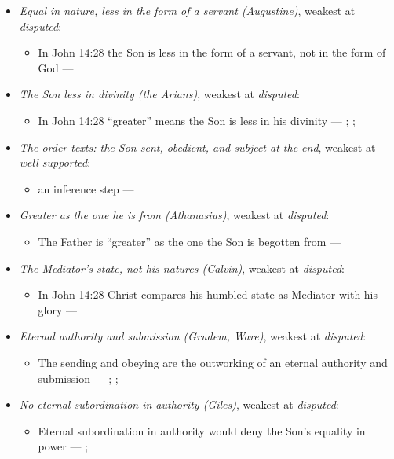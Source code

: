 \documentclass[11pt,paper=\testimonypaper,DIV=13,parskip=false]{scrartcl}
\begin{document}
\begin{itemize}
\item \emph{Equal in nature, less in the form of a servant (Augustine)}, weakest at \emph{disputed}:
\begin{itemize}
\item In John 14:28 the Son is less in the form of a servant, not in the form of God --- \cite[On the Trinity I.7.14]{schaff-nicene-post-nicene-fathers-1-3-1887}
\end{itemize}
\item \emph{The Son less in divinity (the Arians)}, weakest at \emph{disputed}:
\begin{itemize}
\item In John 14:28 “greater” means the Son is less in his divinity --- \cite[De Synodis 28]{schaff-nicene-post-nicene-fathers-2-4-1892}; \cite[On the Trinity I.7.14]{schaff-nicene-post-nicene-fathers-1-3-1887}; \cite[102]{calvin-commentary-john-2-1847}
\end{itemize}
\item \emph{The order texts: the Son sent, obedient, and subject at the end}, weakest at \emph{well supported}:
\begin{itemize}
\item an inference step --- \cite[3, The Triune God]{kibbey-living-systematic-theology-2026}
\end{itemize}
\item \emph{Greater as the one he is from (Athanasius)}, weakest at \emph{disputed}:
\begin{itemize}
\item The Father is “greater” as the one the Son is begotten from --- \cite[Against the Arians I.13.58]{schaff-nicene-post-nicene-fathers-2-4-1892}
\end{itemize}
\item \emph{The Mediator’s state, not his natures (Calvin)}, weakest at \emph{disputed}:
\begin{itemize}
\item In John 14:28 Christ compares his humbled state as Mediator with his glory --- \cite[102--103]{calvin-commentary-john-2-1847}
\end{itemize}
\item \emph{Eternal authority and submission (Grudem, Ware)}, weakest at \emph{disputed}:
\begin{itemize}
\item The sending and obeying are the outworking of an eternal authority and submission --- \cite[40]{grudem-doctrinal-deviations-2015}; \cite{grudem-ets-trinity-2016}; \cite{ware-father-son-holy-spirit-2005}
\end{itemize}
\item \emph{No eternal subordination in authority (Giles)}, weakest at \emph{disputed}:
\begin{itemize}
\item Eternal subordination in authority would deny the Son’s equality in power --- \cite[323]{giles-ets-trinity-2008}; \cite{giles-jesus-and-the-father-2006}
\end{itemize}
\end{itemize}
\end{document}
